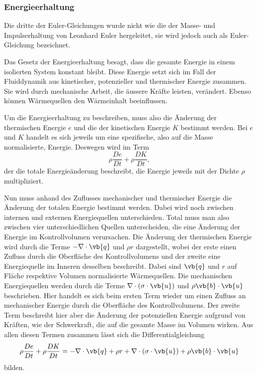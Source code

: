 \subsubsection{Energieerhaltung}
Die dritte der Euler-Gleichungen wurde nicht wie die der Masse- und Impulserhaltung von Leonhard Euler hergeleitet, sie wird jedoch auch als Euler-Gleichung bezeichnet.

Das Gesetz der Energieerhaltung besagt, dass die gesamte Energie in einem isolierten System konstant bleibt.
Diese Energie setzt sich im Fall der Fluiddynamik aus kinetischer, potenzieller und thermischer Energie zusammen.
Sie wird durch mechanische Arbeit, die äussere Kräfte leisten, verändert. Ebenso können Wärmequellen den Wärmeinhalt beeinflussen.

Um die Energieerhaltung zu beschreiben, muss also die Änderung der thermischen Energie $e$ und die der kinetischen Energie $K$ bestimmt werden.
Bei $e$ und  $K$ handelt es sich jeweils um eine spezifische, also auf die Masse normalisierte, Energie.
Deswegen wird im Term 
\[\rho \frac{De}{Dt}+  \rho \frac{DK}{Dt},
\]
der die totale Energieänderung beschreibt, die Energie jeweils mit der Dichte $\rho$ multipliziert.

Nun muss anhand des Zuflusses mechanischer und thermischer Energie die Änderung der totalen Energie bestimmt werden.
Dabei wird noch zwischen internen und externen Energiequellen unterschieden.
Total muss man also zwischen vier unterschiedlichen Quellen unterscheiden, die eine Änderung der Energie im Kontrollvolumen verursachen.
Die Änderung der thermischen Energie wird durch die Terme  $- \nabla \cdot \vb{q}$ und  $\rho r$ dargestellt, wobei der erste einen Zufluss durch die Oberfläche des Kontrollvolumens und der zweite eine Energiequelle im Inneren desselben beschreibt.
Dabei sind $\vb{q}$ und $r$ auf Fläche respektive Volumen normalisierte Wärmequellen.
Die mechanischen Energiequellen werden durch die Terme $\nabla \cdot (\sigma \cdot \vb{u})$ und $\rho \vb{b} \cdot \vb{u}$ beschrieben.
Hier handelt es sich beim ersten Term wieder um einen Zufluss an mechanischer Energie durch die Oberfläche des Kontrollvolumens.  Der zweite Term beschreibt hier aber die Änderung der potenziellen Energie aufgrund von Kräften, wie der Schwerkraft, die auf die gesamte Masse im Volumen wirken.
Aus allen diesen Termen zusammen lässt sich die Differentialgleichung
\begin{equation}
\label{openfoam:euler3}
\rho \frac{De}{Dt}+  \rho \frac{DK}{Dt}
=
- \nabla \cdot \vb{q} + \rho r + \nabla \cdot (\sigma \cdot \vb{u}) + \rho \vb{b} \cdot \vb{u} 
\end{equation} 
bilden.

